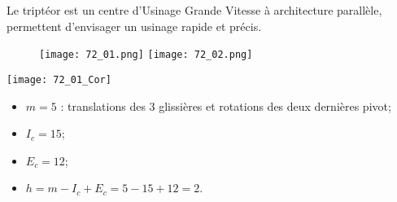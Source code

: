 \normaltrue \difficilefalse \tdifficilefalse
\correctiontrue

\setcounter{question}{0}%


\ifcorrection
\else
{}
\fi

\ifprof
\else
Le triptéor est un centre d'Usinage Grande Vitesse à architecture parallèle, permettent d'envisager un usinage rapide et précis.


\begin{figure}[H]
\centering
\texttt{[image: 72\_01.png]}
\hfill\texttt{[image: 72\_02.png]}
\end{figure}

\fi

\ifprof
\begin{center}
\texttt{[image: 72\_01\_Cor]}
\end{center}
\else
\fi

\ifprof
\begin{itemize}
\item $m=5$ : translations des 3 glissières et rotations des deux dernières pivot;
\item $I_c=15$;
\item $E_c = 12$;
\item $h=m-I_c+E_c = 5 -15 + 12 = 2$.
\end{itemize}
\else
\fi
 

\ifprof
\else
{}%
\fi